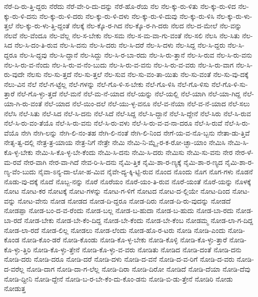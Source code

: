 {ನೆರೆ-ದಿ-ರು-ತ್ತಿ-ದ್ದರು
ನೆರೆದು
ನೆರೆ-ವೇ-ರಿ-ದು-ದನ್ನು
ನೆರೆ-ಹೊ-ರೆಯ
ನೆಲ
ನೆಲ-ಕ್ಕು-ರು-ಳಿತು
ನೆಲ-ಕ್ಕು-ರು-ಳಿದ
ನೆಲ-ಕ್ಕು-ರು-ಳಿ-ದನು
ನೆಲ-ಕ್ಕು-ರು-ಳಿ-ದರು
ನೆಲ-ಕ್ಕು-ರು-ಳಿ-ದಳು
ನೆಲ-ಕ್ಕು-ರು-ಳಿ-ದುವು
ನೆಲ-ಕ್ಕು-ರು-ಳಿಸಿ
ನೆಲ-ಕ್ಕು-ರು-ಳು-ತ್ತಲೆ
ನೆಲ-ಕ್ಕು-ರು-ಳು-ತ್ತಿ-ದ್ದಂತೆ
ನೆಲಕ್ಕೆ
ನೆಲ-ಕ್ಕೊ-ರ-ಗಿದ
ನೆಲ-ಕ್ಕೊ-ರ-ಗಿ-ದರು
ನೆಲದ
ನೆಲ-ದ-ಮೇಲೆ
ನೆಲ-ವನ್ನು
ನೆಲವೆ
ನೆಲ-ವೆಂದೂ
ನೆಲ-ವೆಲ್ಲ
ನೆಲ-ಸ-ಬೇಕು
ನೆಲ-ಸಮ
ನೆಲ-ಸ-ಮ-ವಾ-ಗು-ವಂತೆ
ನೆಲ-ಸಲಿ
ನೆಲಸಿ
ನೆಲ-ಸಿತು
ನೆಲ-ಸಿದ
ನೆಲ-ಸಿ-ದಂ-ತಿ-ರುವ
ನೆಲ-ಸಿ-ದನು
ನೆಲ-ಸಿ-ದರು
ನೆಲ-ಸಿ-ದರೆ
ನೆಲ-ಸಿ-ದಳು
ನೆಲ-ಸಿದ್ದ
ನೆಲ-ಸಿ-ದ್ದರು
ನೆಲ-ಸಿ-ದ್ದರೂ
ನೆಲ-ಸಿ-ದ್ದವು
ನೆಲ-ಸಿ-ದ್ದಾನೆ
ನೆಲ-ಸಿದ್ದು
ನೆಲ-ಸಿ-ರ-ಬಾ-ರದು
ನೆಲ-ಸಿ-ರು-ತ್ತಾನೆ
ನೆಲ-ಸಿ-ರುವ
ನೆಲ-ಸಿ-ರು-ವನು
ನೆಲ-ಸಿ-ರು-ವ-ನೆಂದು
ನೆಲ-ಸಿ-ರು-ವ-ನೆಂ-ಬುದು
ನೆಲ-ಸಿ-ರು-ವ-ವನು
ನೆಲ-ಸಿ-ರು-ವ-ವರು
ನೆಲ-ಸಿ-ರು-ವಾಗ
ನೆಲ-ಸಿ-ರು-ವುದೇ
ನೆಲಸು
ನೆಲ-ಸು-ತ್ತದೆ
ನೆಲ-ಸು-ತ್ತಲೆ
ನೆಲ-ಸುವ
ನೆಲ-ಸು-ವಂ-ತಾ-ಯಿತು
ನೆಲ-ಸು-ವಂತೆ
ನೆಲ-ಸು-ವು-ದಕ್ಕೆ
ನೆಲು-ವಿನ
ನೆಲೆ
ನೆಲೆ-ಗ-ಟ್ಟೆಲ್ಲ
ನೆಲೆ-ಗಳನ್ನು
ನೆಲೆ-ಗೊ-ಳಿ-ಸ-ಬೇಕು
ನೆಲೆ-ಗೊ-ಳಿಸಿ
ನೆಲೆ-ಗೊ-ಳಿಸು
ನೆಲೆ-ಗೊ-ಳಿ-ಸು-ತ್ತಾರೆ
ನೆಲೆ-ಗೊ-ಳ್ಳು-ತ್ತದೆ
ನೆಲೆ-ಮನೆ
ನೆಲೆ-ಮ-ನೆ-ಯಾದ
ನೆಲೆ-ಯನ್ನು
ನೆಲೆ-ಯಲ್ಲಿ
ನೆಲೆ-ಯಾಗಿ
ನೆಲೆ-ಯಾ-ಗಿದ್ದ
ನೆಲೆ-ಯಾ-ಗಿ-ರು-ವಂತೆ
ನೆಲೆ-ಯಾದ
ನೆಲೆ-ಯಿಂ-ದಲೆ
ನೆಲೆ-ಯು-ಳ್ಳ-ವನೂ
ನೆಲೆ-ವ-ನೆಯಾ
ನೆಲೆ-ವ-ನೆ-ಯಾದ
ನೆಲೆ-ಸಲು
ನೆಲೆಸಿ
ನೆಲೆ-ಸಿತು
ನೆಲೆ-ಸಿದ
ನೆಲೆ-ಸಿ-ದನು
ನೆಲೆ-ಸಿದೆ
ನೆಲೆ-ಸಿದ್ದ
ನೆಲೆ-ಸಿ-ದ್ದಾನೆ
ನೆಲೆ-ಸಿ-ದ್ದೇನೆ
ನೆಲೆ-ಸಿರು
ನೆಲೆ-ಸಿ-ರುವ
ನೆಲೆ-ಸಿ-ರು-ವಂ-ತೆಯೊ
ನೆಲೆ-ಸಿ-ರು-ವನು
ನೆಲೆ-ಸಿ-ರು-ವಳು
ನೆಲೆ-ಸಿ-ರು-ವ-ವ-ನಾ-ದರೂ
ನೆಲೆ-ಸಿ-ರುವೆ
ನೆಲೆ-ಸಿ-ರು-ವೆಯೊ
ನೇಗಿ
ನೇಗಿ-ಲನ್ನು
ನೇಗಿ-ಲಿ-ನಂ-ತಹ
ನೇಗಿ-ಲಿ-ನಂತೆ
ನೇಗಿ-ಲಿ-ನಿಂದ
ನೇಗೆ-ಯ-ವ-ನೊ-ಬ್ಬನು
ನೇತಾ-ಡು-ತ್ತಿವೆ
ನೇತೃ-ತ್ವ-ದಲ್ಲಿ
ನೇತ್ರ-ತ್ರ-ಯಾಯ
ನೇತ್ರ-ನಿಗೆ
ನೇತ್ರೇ
ನೇಮಿ
ನೇಮಿ-ನಿ-ಮ್ನೈ-ರ-ಕ-ರೋ-ಚ್ಛಾ-ಯಾಂ
ನೇಮಿಸಿ
ನೇಮಿ-ಸಿ-ಕೊ-ಳ್ಳ-ಬೇಕು
ನೇಮಿ-ಸಿ-ಕೊ-ಳ್ಳ-ಬೇ-ಕೆಂದು
ನೇಮಿ-ಸಿ-ದನು
ನೇಮಿ-ಸಿ-ದರು
ನೇಮಿಸು
ನೇಮಿ-ಸು-ವನು
ನೇರ
ನೇರ-ಳೆ-ಮ-ರವೆ
ನೇರ-ವಾಗಿ
ನೇರ-ವಾ-ಗಿದೆ
ನೇವ-ರಿ-ಸಿ-ದನು
ನೈಮಿ-ತ್ತಿಕ
ನೈಮಿ-ಶಾ-ರ-ಣ್ಯಕ್ಕೆ
ನೈಮಿ-ಶಾ-ರ-ಣ್ಯದ
ನೈಮಿ-ಶಾ-ರ-ಣ್ಯ-ವೆಂ-ಬುದು
ನೈವಾ-ಽನ್ಯ-ದಾ-ಲೋ-ಹ-ಮಿವ
ನೈವೇ-ದ್ಯ-ಕ್ಕಿ-ಟ್ಟಿ-ರುವ
ನೊಂದ
ನೊಂದು
ನೊಗ
ನೊಗ-ಗಳು
ನೊಡನೆ
ನೊಡು-ವು-ದಕ್ಕೆ
ನೊದೆ
ನೊಬ್ಬ-ನನ್ನು
ನೊರೆ
ನೊರೆಯಂ
ನೊರೆ-ಯಂ-ತಿ-ರುವ
ನೊರೆ-ಯಂತೆ
ನೊರೆ-ಯನ್ನು
ನೊಳಕ್ಕೆ
ನೋಟ
ನೋಟ-ಕರ
ನೋಟಕ್ಕೆ
ನೋಟ-ಗಳನ್ನು
ನೋಟ-ಗ-ಳಿಗೆ
ನೋಟದ
ನೋಟ-ದ-ಲ್ಲಿಯೇ
ನೋಟ-ದಿಂದ
ನೋಟ-ವನ್ನು
ನೋಟ-ವೇನು
ನೋಡ
ನೋಡದ
ನೋಡ-ದಿ-ದ್ದರೂ
ನೋಡ-ದಿರು
ನೋಡ-ದಿ-ರು-ವುದನ್ನು
ನೋಡದೆ
ನೋಡಪ್ಪಾ
ನೋಡ-ಬಂ-ದ-ವ-ರೆಂದು
ನೋಡ-ಬಲ್ಲ
ನೋಡ-ಬ-ಹುದಾ
ನೋಡ-ಬ-ಹುದು
ನೋಡ-ಬಾ-ರದು
ನೋಡ-ಬಾ-ರದೆ
ನೋಡ-ಬೇಕು
ನೋಡ-ಬೇ-ಕೆಂ-ದಿದ್ದ
ನೋಡ-ಬೇ-ಕೆಂದು
ನೋಡ-ಬೇ-ಕೆಂಬ
ನೋಡಮ್ಮ
ನೋಡ-ಲಾ-ಗ-ದಿದ್ದ
ನೋಡ-ಲಾ-ರದೆ
ನೋಡ-ಲಿಲ್ಲ
ನೋಡಲು
ನೋಡ-ಲೆಂದು
ನೋಡ-ಹೊ-ರ-ಟರು
ನೋಡಿ
ನೋಡಿ-ಎಂದು
ನೋಡಿ-ಕೊಂಡ
ನೋಡಿ-ಕೊಂ-ಡರೆ
ನೋಡಿ-ಕೊಂಡು
ನೋಡಿ-ಕೊ-ಳ್ಳ-ಬೇಕು
ನೋಡಿ-ಕೊಳ್ಳಿ
ನೋಡಿ-ಕೊ-ಳ್ಳು-ತ್ತಾರೆ
ನೋಡಿ-ಕೊ-ಳ್ಳು-ತ್ತಿರಿ
ನೋಡಿ-ಕೊ-ಳ್ಳು-ತ್ತೇನೆ
ನೋಡಿ-ಕೊ-ಳ್ಳು-ವ-ವರು
ನೋಡಿತು
ನೋಡಿದ
ನೋಡಿ-ದಂತೆ
ನೋಡಿ-ದನು
ನೋಡಿ-ದರು
ನೋಡಿ-ದರೂ
ನೋಡಿ-ದರೆ
ನೋಡಿ-ದಳು
ನೋಡಿ-ದ-ವನೆ
ನೋಡಿ-ದ-ವ-ರಿಗೆ
ನೋಡಿ-ದ-ವರು
ನೋಡಿ-ದ-ವರೆಲ್ಲ
ನೋಡಿ-ದಾಗ
ನೋಡಿ-ದಾ-ಗ-ಲೆಲ್ಲ
ನೋಡಿ-ದಿರಾ
ನೋಡಿ-ದಿರೋ
ನೋಡಿದೆ
ನೋಡಿ-ದೆಯಾ
ನೋಡಿ-ದೆವು
ನೋಡಿ-ದ್ದೀನಿ
ನೋಡಿ-ದ್ದೇನೆ
ನೋಡಿ-ಬ-ರ-ಬೇ-ಕೆಂ-ದು-ಕೊಂ-ಡನು
ನೋಡಿ-ಬಿ-ಡು-ತ್ತೇನೆ
ನೋಡಿರಿ
ನೋಡು
ನೋಡುತ್ತ
}
